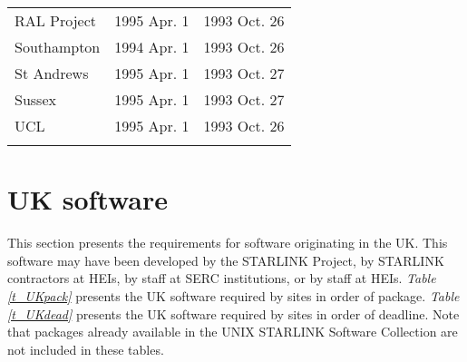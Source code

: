 \begin{table}
\begin{center}
\begin{tabular}{|l|l|l|}
RAL Project           & 1995 Apr. 1  & 1993 Oct. 26 \\
Southampton           & 1994 Apr. 1  & 1993 Oct. 26 \\
St Andrews            & 1995 Apr. 1  & 1993 Oct. 27 \\
Sussex                & 1995 Apr. 1  & 1993 Oct. 27 \\
UCL                   & 1995 Apr. 1  & 1993 Oct. 26 \\
& & \\ \hline                   
\end{tabular}
\end{center}
\end{table}


\newpage
\section{UK software}

This section presents the requirements for software originating in the UK.
This software may have been developed by the STARLINK Project, by STARLINK 
contractors at HEIs, by staff at SERC institutions, or by staff at HEIs.
{\em Table \ref{t_UKpack}} presents the UK software required by sites in 
order of package.
{\em Table \ref{t_UKdead}} presents the UK software required by sites in 
order of deadline.
Note that packages already available in the UNIX STARLINK Software Collection
are not included in these tables.


